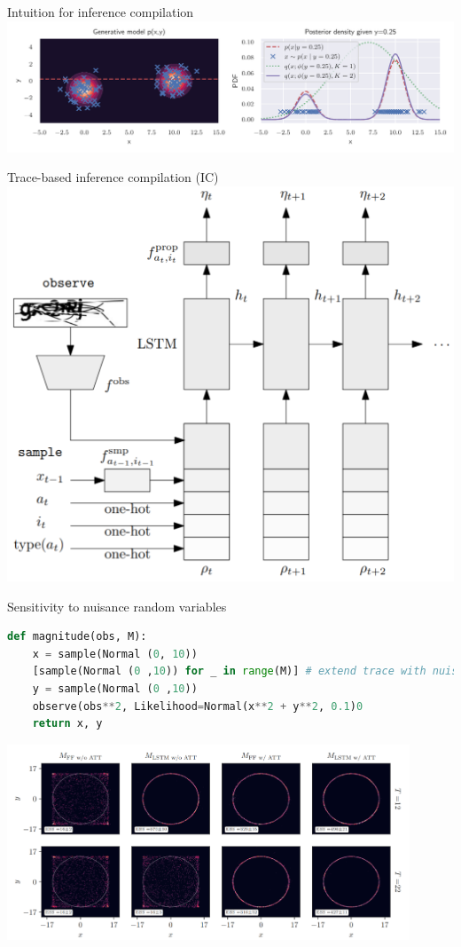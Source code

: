 \documentclass[12pt]{beamer}
\begin{document}
\begin{frame}{Intuition for inference compilation}
    \includegraphics[width=\textwidth]{figures/intuition.pdf}
\end{frame}

\begin{frame}{Trace-based inference compilation (IC)}
    \centering
    \includegraphics[width=0.7\linewidth]{figures/ic-lstm.png}
\end{frame}

\begin{frame}[fragile]{Sensitivity to nuisance random variables}
    \begin{lstlisting}[language=Python]
def magnitude(obs, M):
    x = sample(Normal (0, 10))
    [sample(Normal (0 ,10)) for _ in range(M)] # extend trace with nuisance
    y = sample(Normal (0 ,10))
    observe(obs**2, Likelihood=Normal(x**2 + y**2, 0.1)0
    return x, y
    \end{lstlisting}

    \includegraphics[width=0.9\textwidth]{figures/attention.png}
\end{frame}
\end{document}
